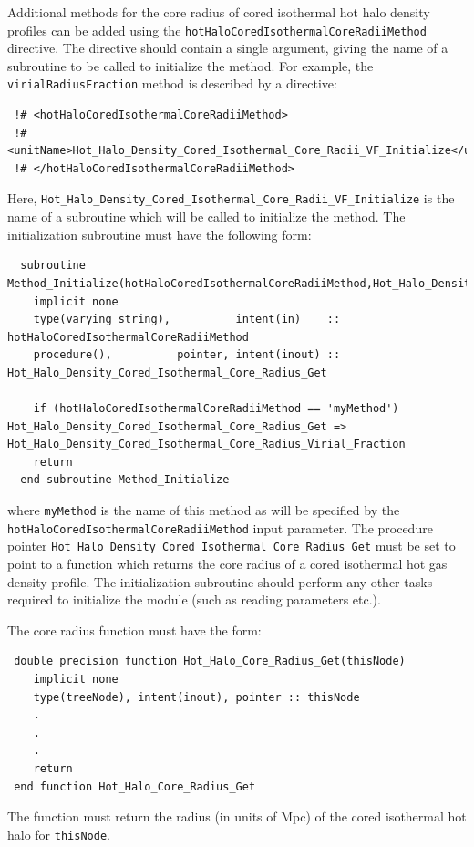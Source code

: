 Additional methods for the core radius of cored isothermal hot halo density profiles can be added using the {\tt hotHaloCoredIsothermalCoreRadiiMethod} directive. The directive should contain a single argument, giving the name of a subroutine to be called to initialize the method. For example, the {\tt virialRadiusFraction} method is described by a directive:
\begin{verbatim}
 !# <hotHaloCoredIsothermalCoreRadiiMethod>
 !#  <unitName>Hot_Halo_Density_Cored_Isothermal_Core_Radii_VF_Initialize</unitName>
 !# </hotHaloCoredIsothermalCoreRadiiMethod>
\end{verbatim}
Here, {\tt Hot\_Halo\_Density\_Cored\_Isothermal\_Core\_Radii\_VF\_Initialize} is the name of a subroutine which will be called to initialize the method. The initialization subroutine must have the following form:
\begin{verbatim}
  subroutine Method_Initialize(hotHaloCoredIsothermalCoreRadiiMethod,Hot_Halo_Density_Cored_Isothermal_Core_Radius_Get)
    implicit none
    type(varying_string),          intent(in)    :: hotHaloCoredIsothermalCoreRadiiMethod
    procedure(),          pointer, intent(inout) :: Hot_Halo_Density_Cored_Isothermal_Core_Radius_Get
    
    if (hotHaloCoredIsothermalCoreRadiiMethod == 'myMethod') Hot_Halo_Density_Cored_Isothermal_Core_Radius_Get => Hot_Halo_Density_Cored_Isothermal_Core_Radius_Virial_Fraction
    return
  end subroutine Method_Initialize
\end{verbatim}
where {\tt myMethod} is the name of this method as will be specified by the {\tt hotHaloCoredIsothermalCoreRadiiMethod} input parameter. The procedure pointer {\tt Hot\_Halo\_Density\_Cored\_Isothermal\_Core\_Radius\_Get} must be set to point to a function which returns the core radius of a cored isothermal hot gas density profile. The initialization subroutine should perform any other tasks required to initialize the module (such as reading parameters etc.).

The core radius function must have the form:
\begin{verbatim}
 double precision function Hot_Halo_Core_Radius_Get(thisNode)
    implicit none
    type(treeNode), intent(inout), pointer :: thisNode
    .
    .
    .
    return
 end function Hot_Halo_Core_Radius_Get
\end{verbatim}
The function must return the radius (in units of Mpc) of the cored isothermal hot halo for {\tt thisNode}.

